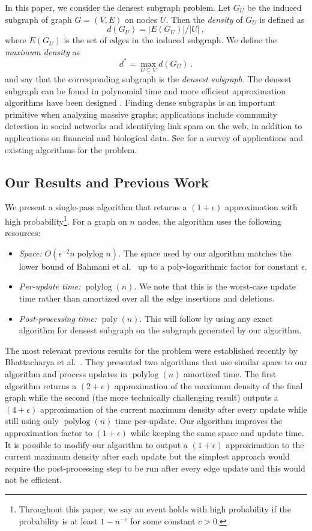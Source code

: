 \documentclass[11pt]{article}
\DeclareMathOperator{\polylog}{polylog}
\DeclareMathOperator{\poly}{poly}
\begin{document}
In this paper, we consider the densest subgraph problem.
Let $G_U$ be the induced subgraph of graph $G=(V,E)$ on nodes $U$. Then the \emph{density} of $G_U$ is defined as \[d(G_U)=|E(G_U)|/|U| \ ,\] where $E(G_U)$ is the set of edges in the induced subgraph. We define the \emph{maximum density} as 
\[
d^* = \max_{U\subseteq V} d(G_U) \ .
\]
and say that the corresponding subgraph is the \emph{densest subgraph}. The densest subgraph can be found in polynomial time 
\cite{GalloGT89,Goldberg84,Charikar00,KhullerS09} and more efficient approximation algorithms have been designed \cite{Charikar00}. Finding dense subgraphs is an important primitive when analyzing massive graphs; applications include community detection in social networks and identifying link spam on the web, in addition to applications on financial and biological data.  See \cite{densesurvey} for a survey of applications and existing algorithms for the problem.

\subsection{Our Results and Previous Work}

We present a single-pass algorithm that returns a $(1+\epsilon)$ approximation with high probability\footnote{Throughout this paper, we say an event holds with high probability if the probability is at least $1-n^{-c}$ for some constant $c>0$.}. For a graph on $n$ nodes, the algorithm uses the following resources:
\begin{itemize} 
\item {\em Space:} $O(\epsilon^{-2} n \polylog n)$. The space used by our algorithm matches the lower bound of Bahmani  et al.~\cite{BahmaniKV12} up to a poly-logarithmic factor for constant $\epsilon$. 
\item {\em Per-update time:} $\polylog (n)$. We note that this is the worst-case update time rather than amortized over all the edge insertions and deletions. 
\item {\em Post-processing time:} $\poly(n)$. This will follow by using any exact algorithm for densest subgraph \cite{GalloGT89,Goldberg84,Charikar00} on the subgraph  generated  by our algorithm.
\end{itemize}  

The most relevant previous results for the problem were established recently by Bhattacharya et al.~\cite{BhattacharyaHNT15}. They presented two algorithms that use similar space to our algorithm and process updates in $\polylog (n)$ amortized time. The first algorithm returns a $(2+\epsilon)$ approximation of the maximum density of the final graph while the second (the more technically challenging result) outputs a $(4+\epsilon)$ approximation of the current maximum density after every update while still using only $\polylog (n)$ time per-update. 
Our algorithm improves the approximation factor to $(1+\epsilon)$ while keeping the same space and update time. It is possible to modify our algorithm to output a $(1+\epsilon)$ approximation to the current maximum density after each update but the simplest approach would require the post-processing step  to be run after every edge update and this  would not be efficient.
\end{document}
